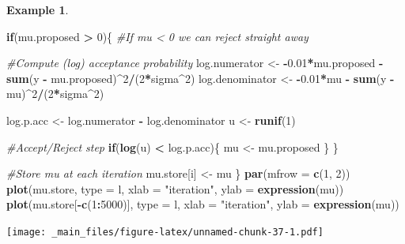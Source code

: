\documentclass[
]{book}
\newenvironment{Shaded}{\begin{snugshade}}{\end{snugshade}}
\newcommand{\AttributeTok}[1]{\textcolor[rgb]{0.13,0.29,0.53}{#1}}
\newcommand{\CommentTok}[1]{\textcolor[rgb]{0.56,0.35,0.01}{\textit{#1}}}
\newcommand{\ControlFlowTok}[1]{\textcolor[rgb]{0.13,0.29,0.53}{\textbf{#1}}}
\newcommand{\DecValTok}[1]{\textcolor[rgb]{0.00,0.00,0.81}{#1}}
\newcommand{\FloatTok}[1]{\textcolor[rgb]{0.00,0.00,0.81}{#1}}
\newcommand{\FunctionTok}[1]{\textcolor[rgb]{0.13,0.29,0.53}{\textbf{#1}}}
\newcommand{\NormalTok}[1]{#1}
\newcommand{\OtherTok}[1]{\textcolor[rgb]{0.56,0.35,0.01}{#1}}
\newcommand{\SpecialCharTok}[1]{\textcolor[rgb]{0.81,0.36,0.00}{\textbf{#1}}}
\newcommand{\StringTok}[1]{\textcolor[rgb]{0.31,0.60,0.02}{#1}}
\theoremstyle{definition}
\theoremstyle{definition}
\newtheorem{example}{Example}[chapter]
\theoremstyle{definition}
\theoremstyle{definition}
\theoremstyle{remark}
\begin{document}
\begin{example}
\begin{Shaded}
\begin{Highlighting}[]
  \ControlFlowTok{if}\NormalTok{(mu.proposed }\SpecialCharTok{\textgreater{}} \DecValTok{0}\NormalTok{)\{ }\CommentTok{\#If mu \textless{} 0 we can reject straight away}
    
    \CommentTok{\#Compute (log) acceptance probability}
\NormalTok{    log.numerator   }\OtherTok{\textless{}{-}} \SpecialCharTok{{-}}\FloatTok{0.01}\SpecialCharTok{*}\NormalTok{mu.proposed }\SpecialCharTok{{-}}
                        \FunctionTok{sum}\NormalTok{(y }\SpecialCharTok{{-}}\NormalTok{ mu.proposed)}\SpecialCharTok{\^{}}\DecValTok{2}\SpecialCharTok{/}\NormalTok{(}\DecValTok{2}\SpecialCharTok{*}\NormalTok{sigma}\SpecialCharTok{\^{}}\DecValTok{2}\NormalTok{)}
\NormalTok{    log.denominator }\OtherTok{\textless{}{-}} \SpecialCharTok{{-}}\FloatTok{0.01}\SpecialCharTok{*}\NormalTok{mu }\SpecialCharTok{{-}} \FunctionTok{sum}\NormalTok{(y }\SpecialCharTok{{-}}\NormalTok{ mu)}\SpecialCharTok{\^{}}\DecValTok{2}\SpecialCharTok{/}\NormalTok{(}\DecValTok{2}\SpecialCharTok{*}\NormalTok{sigma}\SpecialCharTok{\^{}}\DecValTok{2}\NormalTok{)}
    
\NormalTok{    log.p.acc }\OtherTok{\textless{}{-}}\NormalTok{ log.numerator }\SpecialCharTok{{-}}\NormalTok{ log.denominator}
\NormalTok{    u }\OtherTok{\textless{}{-}} \FunctionTok{runif}\NormalTok{(}\DecValTok{1}\NormalTok{)}
    
    \CommentTok{\#Accept/Reject step}
    \ControlFlowTok{if}\NormalTok{(}\FunctionTok{log}\NormalTok{(u) }\SpecialCharTok{\textless{}}\NormalTok{ log.p.acc)\{}
\NormalTok{      mu }\OtherTok{\textless{}{-}}\NormalTok{ mu.proposed}
\NormalTok{    \}}
\NormalTok{  \}}
  
  \CommentTok{\#Store mu at each iteration}
\NormalTok{  mu.store[i] }\OtherTok{\textless{}{-}}\NormalTok{ mu}
\NormalTok{\}}
\FunctionTok{par}\NormalTok{(}\AttributeTok{mfrow =} \FunctionTok{c}\NormalTok{(}\DecValTok{1}\NormalTok{, }\DecValTok{2}\NormalTok{))}
\FunctionTok{plot}\NormalTok{(mu.store, }\AttributeTok{type =} \StringTok{\textquotesingle{}l\textquotesingle{}}\NormalTok{, }\AttributeTok{xlab =} \StringTok{"iteration"}\NormalTok{, }\AttributeTok{ylab =} \FunctionTok{expression}\NormalTok{(mu))}
\FunctionTok{plot}\NormalTok{(mu.store[}\SpecialCharTok{{-}}\FunctionTok{c}\NormalTok{(}\DecValTok{1}\SpecialCharTok{:}\DecValTok{5000}\NormalTok{)], }\AttributeTok{type =} \StringTok{\textquotesingle{}l\textquotesingle{}}\NormalTok{, }\AttributeTok{xlab =} \StringTok{"iteration"}\NormalTok{,}
     \AttributeTok{ylab =} \FunctionTok{expression}\NormalTok{(mu))}
\end{Highlighting}
\end{Shaded}

\texttt{[image: \_main\_files/figure-latex/unnamed-chunk-37-1.pdf]}
\end{example}
\end{document}
